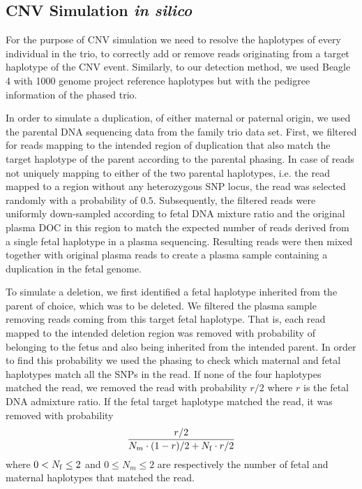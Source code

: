 \subsection{CNV Simulation \emph{in silico}}\label{ss:simulation}
For the purpose of CNV simulation we need to resolve the haplotypes of every individual in the trio, to correctly add or remove reads originating from a target haplotype of the CNV event. Similarly, to our detection method, we used Beagle 4 with 1000 genome project reference haplotypes but with the pedigree information of the phased trio.

	In order to simulate a duplication, of either maternal or paternal origin, we used the parental DNA sequencing data from the family trio data set. First, we filtered for reads mapping to the intended region of duplication that also match the target haplotype of the parent according to the parental phasing. In case of reads not uniquely mapping to either of the two parental haplotypes, i.e. the read mapped to a region without any heterozygous SNP locus, the read was selected randomly with a probability of $0.5$. Subsequently, the filtered reads were uniformly down-sampled according to fetal DNA mixture ratio and the original plasma DOC in this region to match the expected number of reads derived from a single fetal haplotype in a plasma sequencing. Resulting reads were then mixed together with original plasma reads to create a plasma sample containing a duplication in the fetal genome.
	
	To simulate a deletion, we first identified a fetal haplotype inherited from the parent of choice, which was to be deleted. We filtered the plasma sample removing reads coming from this target fetal haplotype. That is, each read mapped to the intended deletion region was removed with probability of belonging to the fetus and also being inherited from the intended parent. In order to find this probability we used the phasing to check which maternal and fetal haplotypes match all the SNPs in the read.  If none of the four haplotypes matched the read, we removed the read with probability $r/2$ where $r$ is the fetal DNA admixture ratio. If the fetal target haplotype matched the read, it was removed with probability
\begin{align*}
\frac{ r/2 } { N_m \cdot (1-r)/2 + N_{\mathrm{f}} \cdot r/2}
\end{align*}
where $0 < N_{\mathrm{f}} \leq 2$ and $0 \leq N_m \leq 2$ are respectively the number of fetal and maternal haplotypes that matched the read.
	
